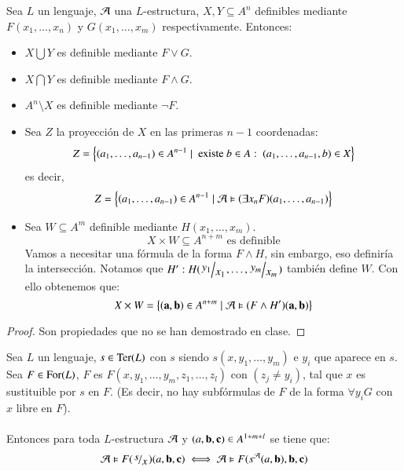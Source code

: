 \begin{pro}
    Sea $L$ un lenguaje, $\mathcal{A}$ una $L$-estructura, $X, Y \subseteq A^n$ definibles mediante $F(x_1, \ldots, x_n)$ y $G(x_1, \ldots, x_m)$ respectivamente. Entonces:
    \begin{itemize}
        \item $ X \bigcup Y$ es definible mediante $F \lor G$.
        \item $ X \bigcap Y$ es definible mediante $F \land G$.
        \item $A^n \setminus X$ es definible mediante $\neg F$.
        \item Sea $Z$ la proyección de $X$ en las primeras $n - 1$ coordenadas:
        $$
            Z = \left\{(a_1, \ldots, a_{n-1}) \in A^{n-1} \mid \text{ existe } b\in A:\ (a_1, \ldots, a_{n-1}, b) \in X\right\}
        $$
        es decir,
        $$
            Z = \left\{(a_1, \ldots, a_{n-1}) \in A^{n-1} \mid \mathcal{A} \vDash (\exists x_n F)(a_1, \ldots, a_{n-1})\right\}
        $$
        \item Sea $W \subseteq A^m$ definible mediante $H(x_1, \ldots, x_m)$.
        $$
            X \times W \subseteq A^{n+m} \text{ es definible}
        $$
        Vamos a necesitar una fórmula de la forma $F \land H$, sin embargo, eso definiría la intersección. Notamos que $H': H(\quo{y_1}{x_1}, \ldots, \quo{y_m}{x_m})$ también define $W$. Con ello obtenemos que:
        $$
            X \times W = \left\{(\mathbf{a}, \mathbf{b}) \in A^{n+m} \mid \mathcal{A} \vDash (F \land H')(\mathbf{a}, \mathbf{b})\right\}
        $$
    \end{itemize}
\end{pro}
\begin{proof}
    Son propiedades que no se han demostrado en clase.
\end{proof}

\begin{pro}\label{pro:1.2}
    Sea $L$ un lenguaje, $s \in \mathrm{Ter}(L)$ con $s$ siendo $s(x, y_1, \ldots, y_m)$ e $y_i$ que aparece en $s$. Sea $F \in \mathrm{For}(L)$, $F$ es $F(x, y_1, \ldots, y_m, z_1, \ldots, z_l)$ con $(z_j \neq y_i)$, tal que $x$ es sustituible por $s$ en $F$. (Es decir, no hay subfórmulas de $F$ de la forma $\forall y_i G$ con $x$ libre en $F$).\\\\
    Entonces para toda $L$-estructura $\mathcal{A}$ y $(a, \mathbf{b}, \mathbf{c}) \in A^{1+m+l}$ se tiene que:
    $$
        \mtc A \vDash F(\quo{s}{x})(a, \mbf b, \mbf c) \iff \mtc A \vDash F(s^\mtc A(a, \mbf b), \mbf b, \mbf c)
    $$
\end{pro}

